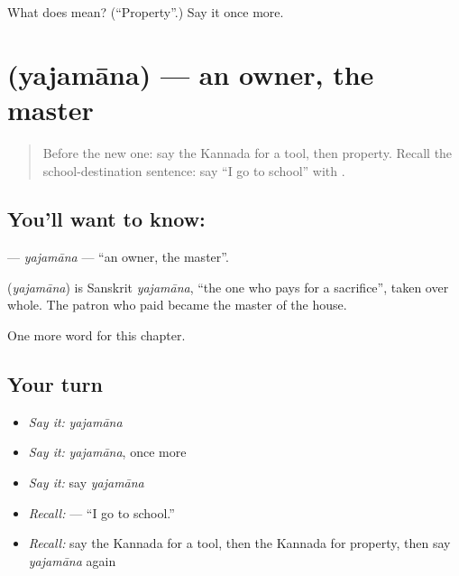 \begin{tcolorbox}[breakable,colback=teal!4,colframe=teal!35!black,title={Before you move on}]
What does  mean? (\textquotedblleft{}Property\textquotedblright{}.) Say it once more.
\end{tcolorbox}
\section[\texorpdfstring{\kn{ಯಜಮಾನ} (yajamāna)}{ಯಜಮಾನ (yajamāna)}]{ (yajamāna) — an owner, the master}

\label{lesson:KA-C113-yajamana}



\begin{quote}
Before the new one: say the Kannada for a tool, then property. Recall the school-destination sentence: say “I go to school” with \textbf{}.
\end{quote}

\subsection*{You'll want to know: }
\textbf{} — \emph{yajamāna} — \textquotedblleft{}an owner, the master\textquotedblright{}.

\begin{cousinweb}
\textbf{} (\emph{yajamāna}) is Sanskrit \emph{yajamāna}, \textquotedblleft{}the one who pays for a sacrifice\textquotedblright{}, taken over whole. The patron who paid became the master of the house.
\end{cousinweb}

\begin{grammarlens}[title={What you've built}]
One more word for this chapter.
\end{grammarlens}

\subsection*{Your turn}
\begin{itemize}
\raggedright
  \item \emph{Say it:} \emph{yajamāna}
  \item \emph{Say it:} \emph{yajamāna}, once more
  \item \emph{Say it:} say \emph{yajamāna}
  \item \emph{Recall:} \textbf{  } — “I go to school.”
  \item \emph{Recall:} say the Kannada for a tool, then the Kannada for property, then say \emph{yajamāna} again
\end{itemize}

